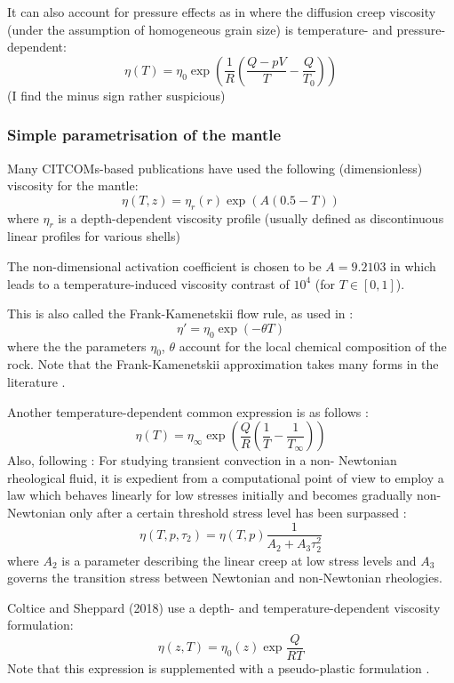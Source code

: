 It can also account for pressure effects as in \cite{lorg18} where the
diffusion creep viscosity (under the assumption of homogeneous grain size)
is temperature- and pressure-dependent:
\[
\eta(T)=\eta_0 \exp \left( \frac{1}{R}(\frac{Q-pV}{T}-\frac{Q}{T_0}) \right)
\]
(I find the minus sign rather suspicious)



\subsubsection{Simple parametrisation of the mantle}

Many CITCOMs-based publications \cite{bumb10,budt14} 
have used the following (dimensionless) viscosity for the mantle:
\[
\eta(T,z) = \eta_r(r) \exp(A(0.5-T))
\]
where $\eta_r$ is a depth-dependent viscosity profile (usually defined as 
discontinuous linear profiles for various shells)

The non-dimensional activation coefficient is chosen to be $A=9.2103$ in 
\cite{budt14} which leads to a temperature-induced viscosity contrast of $10^4$ (for 
$T\in[0,1]$).

This is also called the Frank-Kamenetskii flow rule, as used in \cite{stha13,lemh17}:
\[
\eta' = \eta_0 \exp(-\theta T)
\]
where the the parameters $\eta_0$, $\theta$ account for the local chemical composition of the rock.
Note that the Frank-Kamenetskii approximation takes many forms in the literature \cite{nobr13}.

Another temperature-dependent common expression is as follows \cite{flyu84}:
\[
\eta(T)=\eta_\infty \exp \left( \frac{Q}{R}(\frac{1}{T}-\frac{1}{T_\infty} ) \right)
\]
Also, following \cite{flyu84}: For studying transient convection in a non-
Newtonian rheological fluid, it is expedient from a
computational point of view to employ a law
which behaves linearly for low stresses initially
and becomes gradually non-Newtonian only after
a certain threshold stress level has been surpassed \cite{chri84,chyu84}:
\[
\eta(T,p,\tau_2) =\eta(T,p) \frac{1}{A_2 + A_3 \tau_2^2}
\]
where $A_2$ is a parameter describing the linear creep
at low stress levels and $A_3$ governs the transition
stress between Newtonian and non-Newtonian rheologies.

Coltice and Sheppard (2018) \cite{cosh18} use a depth- and temperature-dependent 
viscosity formulation:
\[
\eta(z,T)=\eta_0(z) \exp \frac{Q}{RT}
\]
Note that this expression is supplemented with a pseudo-plastic formulation \cite{roct12}.

